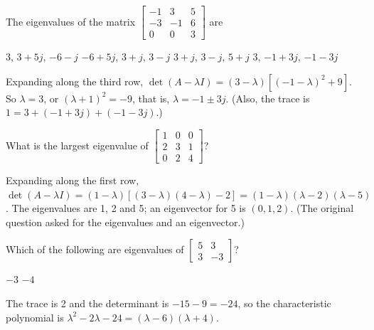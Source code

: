\begin{question}[id=gate-ec2009-1, source=GATE EC 2009, marks=2]
The eigenvalues of the matrix $\begin{bmatrix} -1 & 3 & 5 \\ -3 & -1 & 6 \\ 0 & 0 & 3 \end{bmatrix}$ are
\begin{options}
  \option $3$, $3 + 5j$, $-6 - j$
  \option $-6 + 5j$, $3 + j$, $3 - j$
  \option $3 + j$, $3 - j$, $5 + j$
  \correct $3$, $-1 + 3j$, $-1 - 3j$
\end{options}
\begin{solution}
Expanding along the third row, $\det(A - \lambda I) = (3 - \lambda)\left[(-1 - \lambda)^2 + 9\right]$. So $\lambda = 3$, or $(\lambda + 1)^2 = -9$, that is, $\lambda = -1 \pm 3j$. (Also, the trace is $1 = 3 + (-1 + 3j) + (-1 - 3j)$.)
\end{solution}
\end{question}

\begin{question}[id=gate-me1994-2, source=GATE ME 1994 (adapted), marks=2]
What is the largest eigenvalue of $\begin{bmatrix} 1 & 0 & 0 \\ 2 & 3 & 1 \\ 0 & 2 & 4 \end{bmatrix}$?
\begin{solution}
Expanding along the first row, $\det(A - \lambda I) = (1 - \lambda)\left[(3 - \lambda)(4 - \lambda) - 2\right] = (1 - \lambda)(\lambda - 2)(\lambda - 5)$. The eigenvalues are 1, 2 and 5; an eigenvector for 5 is $(0, 1, 2)$. (The original question asked for the eigenvalues and an eigenvector.)
\end{solution}
\end{question}

\begin{question}[id=gate-me1999-2, type=msq, source=GATE ME 1999 (adapted)]
Which of the following are eigenvalues of $\begin{bmatrix} 5 & 3 \\ 3 & -3 \end{bmatrix}$?
\begin{options}
  \option $-3$
  \correct $-4$
\end{options}
\begin{solution}
The trace is 2 and the determinant is $-15 - 9 = -24$, so the characteristic polynomial is $\lambda^2 - 2\lambda - 24 = (\lambda - 6)(\lambda + 4)$.
\end{solution}
\end{question}

